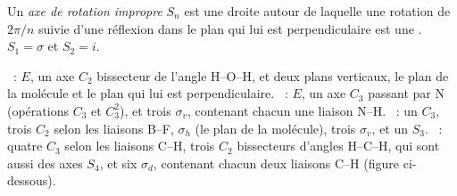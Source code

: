 \begin{definition}\label{def:b3:point-groups:improper}
Un \emph{axe de rotation impropre} $S_n$
est une droite autour de laquelle une rotation de $2\pi/n$ suivie d'une
réflexion dans le plan qui lui est perpendiculaire est une . $S_1 = \sigma$ et $S_2 = i$.
\end{definition}

\begin{example}\label{ex:b3:point-groups:elements}
~: $E$, un axe $C_2$ bissecteur de l'angle H--O--H, et deux plans
verticaux, le plan de la molécule et le plan qui lui est perpendiculaire.
~:
$E$, un axe $C_3$ passant par N (opérations $C_3$ et $C_3^2$), et trois
$\sigma_v$, contenant chacun une liaison N--H. ~: un $C_3$, trois
$C_2$ selon les liaisons B--F,
$\sigma_h$ (le plan de la molécule), trois $\sigma_v$, et un $S_3$.
~: quatre
$C_3$ selon les liaisons C--H, trois $C_2$ bissecteurs d'angles H--C--H,
qui sont aussi des axes $S_4$, et six $\sigma_d$, contenant chacun deux
liaisons C--H (figure ci-dessous).
\end{example}

